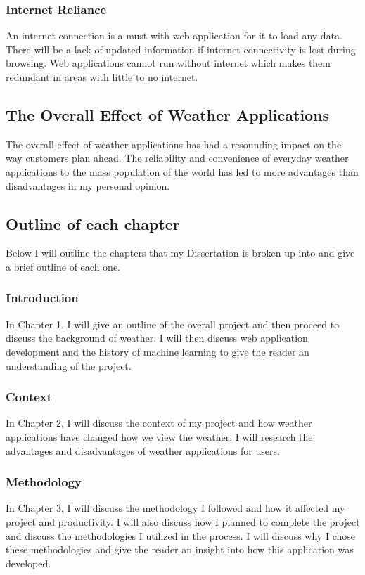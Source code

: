 \subsubsection{Internet Reliance}

An internet connection is a must with web application for it to load any data. There will be a lack of updated information if internet connectivity is lost during browsing. Web applications cannot run without internet which makes them redundant in areas with little to no internet. 

\subsection{The Overall Effect of Weather Applications}

The overall effect of weather applications has had a resounding impact on the way customers plan ahead. The reliability and convenience of everyday weather applications to the mass population of the world has led to more advantages than disadvantages in my personal opinion.

\subsection{Outline of each chapter}
Below I will outline the chapters that my Dissertation is broken up into and give a brief outline of each one.

\subsubsection{Introduction}
In Chapter 1, I will give an outline of the overall project and then proceed to discuss the background of weather. I will then discuss web application development and the history of machine learning to give the reader an understanding of the project.

\subsubsection{Context}
In Chapter 2, I will discuss the context of my project and how weather applications have changed how we view the weather. I will research the advantages and disadvantages of weather applications for users.

\subsubsection{Methodology}
In Chapter 3, I will discuss the methodology I followed and how it affected my project and productivity. I will also discuss how I planned to complete the project and discuss the methodologies I utilized in the process. I will discuss why I chose these methodologies and give the reader an insight into how this application was developed. 

